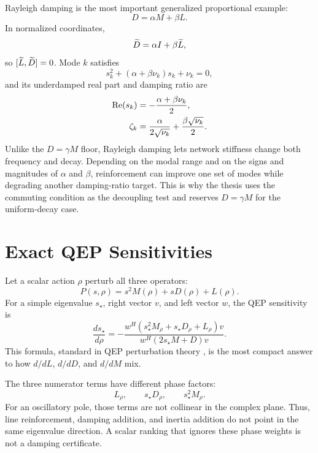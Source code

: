 Rayleigh damping is the most important generalized proportional example:
\begin{equation}
  D=\alpha M+\beta L.
  \label{eq:rayleigh_damping}
\end{equation}
In normalized coordinates,
\begin{equation}
  \widetilde D=\alpha I+\beta\widetilde L,
  \label{eq:rayleigh_normalized}
\end{equation}
so \([\widetilde L,\widetilde D]=0\). Mode \(k\) satisfies
\begin{equation}
  s_k^2+(\alpha+\beta\nu_k)s_k+\nu_k=0,
  \label{eq:rayleigh_mode_polynomial}
\end{equation}
and its underdamped real part and damping ratio are
\begin{align}
  \operatorname{Re}(s_k)&=-\frac{\alpha+\beta\nu_k}{2},
  \label{eq:rayleigh_real_part}\\
  \zeta_k&=
  \frac{\alpha}{2\sqrt{\nu_k}}
  +
  \frac{\beta\sqrt{\nu_k}}{2}.
  \label{eq:rayleigh_zeta}
\end{align}
Unlike the \(D=\gamma M\) floor, Rayleigh damping lets network stiffness change
both frequency and decay. Depending on the modal range and on the signs and
magnitudes of \(\alpha\) and \(\beta\), reinforcement can improve one set of
modes while degrading another damping-ratio target. This is why the thesis
uses the commuting condition as the decoupling test and reserves
\(D=\gamma M\) for the uniform-decay case.

\section{Exact QEP Sensitivities}

Let a scalar action \(\rho\) perturb all three operators:
\begin{equation}
  P(s,\rho)=s^2M(\rho)+sD(\rho)+L(\rho).
\end{equation}
For a simple eigenvalue \(s_\star\), right vector \(v\), and left vector \(w\),
the QEP sensitivity is
\begin{equation}
  \frac{ds_\star}{d\rho}
  =
  -\frac{
  w^H\left(s_\star^2M_\rho+s_\star D_\rho+L_\rho\right)v
  }{
  w^H\left(2s_\star M+D\right)v
  }.
  \label{eq:fixed_full_qep_sens}
\end{equation}
This formula, standard in QEP perturbation theory \cite{tisseur2001qep}, is
the most compact answer to how \(d/dL\), \(d/dD\), and \(d/dM\) mix.

The three numerator terms have different phase factors:
\begin{equation}
  L_\rho,\qquad s_\star D_\rho,\qquad s_\star^2M_\rho.
  \label{eq:phase_weighted_terms}
\end{equation}
For an oscillatory pole, those terms are not collinear in the complex plane.
Thus, line reinforcement, damping addition, and inertia addition do not point
in the same eigenvalue direction. A scalar ranking that ignores these phase
weights is not a damping certificate.

